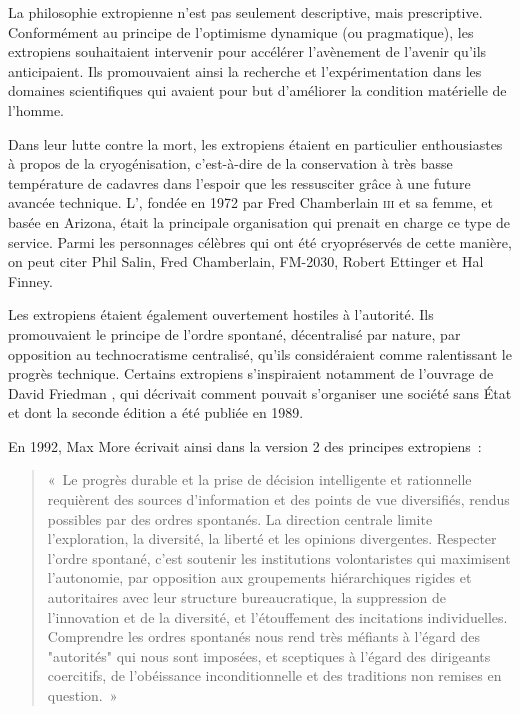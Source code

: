 La philosophie extropienne n'est pas seulement descriptive, mais prescriptive. Conformément au principe de l'optimisme dynamique (ou pragmatique), les extropiens souhaitaient intervenir pour accélérer l'avènement de l'avenir qu'ils anticipaient. Ils promouvaient ainsi la recherche et l'expérimentation dans les domaines scientifiques qui avaient pour but d'améliorer la condition matérielle de l'homme.

Dans leur lutte contre la mort, les extropiens étaient en particulier enthousiastes à propos de la cryogénisation, c'est-à-dire de la conservation à très basse température de cadavres dans l'espoir que les ressusciter grâce à une future avancée technique. L', fondée en 1972 par Fred Chamberlain \textsc{iii} et sa femme, et basée en Arizona, était la principale organisation qui prenait en charge ce type de service. Parmi les personnages célèbres qui ont été cryopréservés de cette manière, on peut citer Phil Salin, Fred Chamberlain, FM-2030, Robert Ettinger et Hal Finney.

Les extropiens étaient également ouvertement hostiles à l'autorité. Ils promouvaient le principe de l'ordre spontané, décentralisé par nature, par opposition au technocratisme centralisé, qu'ils considéraient comme ralentissant le progrès technique. Certains extropiens s'inspiraient notamment de l'ouvrage de David Friedman , qui décrivait comment pouvait s'organiser une société sans État et dont la seconde édition a été publiée en 1989.

En 1992, Max More écrivait ainsi dans la version 2 des principes extropiens~:

\begin{quote}
«~Le progrès durable et la prise de décision intelligente et rationnelle requièrent des sources d'information et des points de vue diversifiés, rendus possibles par des ordres spontanés. La direction centrale limite l'exploration, la diversité, la liberté et les opinions divergentes. Respecter l'ordre spontané, c'est soutenir les institutions volontaristes qui maximisent l'autonomie, par opposition aux groupements hiérarchiques rigides et autoritaires avec leur structure bureaucratique, la suppression de l'innovation et de la diversité, et l'étouffement des incitations individuelles. Comprendre les ordres spontanés nous rend très méfiants à l'égard des "autorités" qui nous sont imposées, et sceptiques à l'égard des dirigeants coercitifs, de l'obéissance inconditionnelle et des traditions non remises en question.~»
\end{quote}

